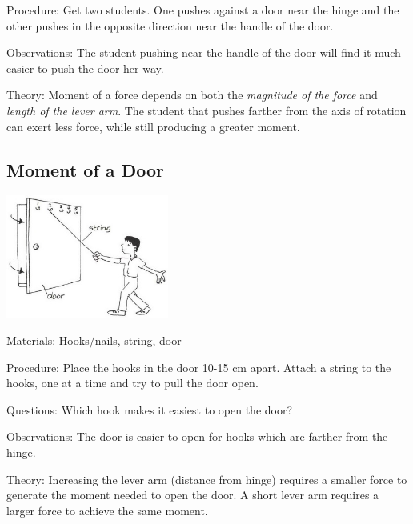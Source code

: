 \begin{multicols}{2}
\begin{description*}
\item[Procedure:]{Get two students. One pushes against a door near the hinge and the other pushes in the opposite direction near the handle of the door.}
\item[Observations:]{The student pushing near the handle of the door will find it much easier to push the door her way.}
\item[Theory:]{Moment of a force depends on both the \emph{magnitude of the force} and \emph{length of the lever arm}. The student that pushes farther from the axis of rotation can exert less force, while still producing a greater moment.}
\end{description*}

\subsection{Moment of a Door}

\begin{center}
\includegraphics[width=0.4\textwidth]{./img/vso/doors-levers.jpg}
\end{center}

\begin{description*}
\item[Materials:]{Hooks/nails, string, door}
\item[Procedure:]{Place the hooks in the door 10-15 cm apart. Attach a string to the hooks, one at a time and try to pull the door open.}
\item[Questions:]{Which hook makes it easiest to open the door?}
\item[Observations:]{The door is easier to open for hooks which are farther from the hinge.}
\item[Theory:]{Increasing the lever arm (distance from hinge) requires a smaller force to generate the moment needed to open the door. A short lever arm requires a larger force to achieve the same moment.}
\end{description*}


\end{multicols}
